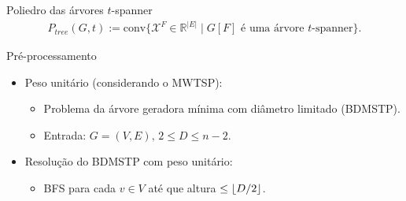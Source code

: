 \documentclass[dvipsnames]{beamer}
\DeclarePairedDelimiter\floor{\lfloor}{\rfloor}
\newcommand{\incid}{\mathcal{X}}
\newcommand{\espacoX}{\mathbb{R}^{|E|}}
\newcommand{\spanBridge}{\mathcal{B}}
\newcommand{\BridgeG}{\spanBridge^{t}(G)}
\begin{document}

\begin{frame}{Poliedro das árvores $t$-spanner}
\begin{equation*}
\begin{split}
P_{tree}(G,t) :=  \text{conv}\{\incid^{F} \in \espacoX\; |\; \text{$G[F]$ é uma árvore $t$-spanner\}}. 
\end{split}
\end{equation*}  
  \end{frame}



\begin{frame}{Pré-processamento}
  \begin{itemize}
  \item Peso unitário (considerando o MWTSP):
    \begin{itemize}
    \item Problema da árvore geradora mínima com diâmetro limitado (BDMSTP).
      \item Entrada: $G = (V,E),\, 2 \le D \le n - 2$.
    \end{itemize}
  \item Resolução do BDMSTP com peso unitário:
    \begin{itemize}
    \item BFS para cada $v \in V$ até que altura $\le \floor{D / 2}$.
    \end{itemize}
  \end{itemize}
\end{frame}
\end{document}
